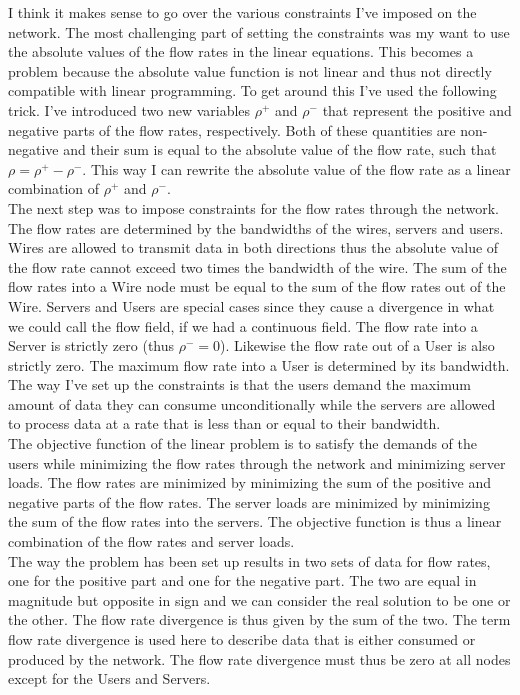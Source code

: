 \documentclass[10pt, titlepage, a4paper]{article}
\begin{document}
I think it makes sense to go over the various constraints I've imposed on the network. The most challenging part of setting 
the constraints was my want to use the absolute values of the flow rates in the linear equations. This becomes a problem 
because the absolute value function is not linear and thus not directly compatible with linear programming. To get around 
this I've used the following trick. I've introduced two new variables $\rho^+$ and $\rho^-$ that represent the positive and
negative parts of the flow rates, respectively. Both of these quantities are non-negative and their sum is equal to the
absolute value of the flow rate, such that $\rho = \rho^+ - \rho^-$. This way I can rewrite the absolute value of the flow rate
as a linear combination of $\rho^+$ and $\rho^-$. \\ 

The next step was to impose constraints for the flow rates through the 
network. The flow rates are determined by the bandwidths of the wires, servers and users. Wires are allowed to transmit 
data in both directions thus the absolute value of the flow rate cannot exceed two times the bandwidth of the wire. The sum 
of the flow rates into a Wire node must be equal to the sum of the flow rates out of the Wire. Servers and Users are special 
cases since they cause a divergence in what we could call the flow field, if we had a continuous field. The flow rate into a
Server is strictly zero (thus $\rho^- = 0$). Likewise the flow rate out of a User is also strictly zero. The maximum flow
rate into a User is determined by its bandwidth. The way I've set up the constraints is that the users demand the 
maximum amount of data they can consume unconditionally while the servers are allowed to process data at
a rate that is less than or equal to their bandwidth. \\

The objective function of the linear problem is to satisfy the demands of the users while minimizing the flow rates 
through the network and minimizing server loads. The flow rates are minimized by minimizing the sum of the positive and
negative parts of the flow rates. The server loads are minimized by minimizing the sum of the flow rates into the servers.
The objective function is thus a linear combination of the flow rates and server loads. \\

The way the problem has been set up results in two sets of data for flow rates, one for the positive part and
one for the negative part. The two are equal in magnitude but opposite in sign and we can consider the real 
solution to be one or the other. The flow rate divergence is thus given by the sum of the two. The term flow rate 
divergence is used here to describe data that is either consumed or produced by the network. The flow rate divergence
must thus be zero at all nodes except for the Users and Servers. \\
\end{document}
